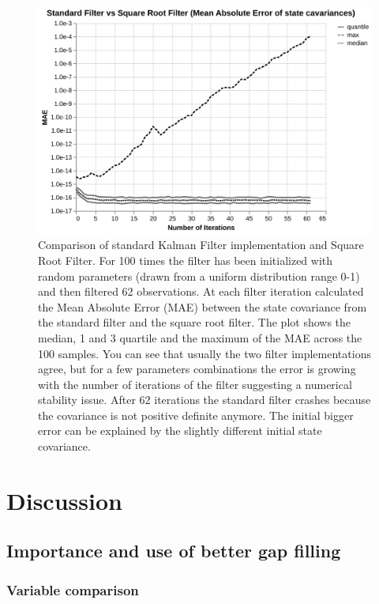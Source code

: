 \documentclass{article}
\let\Oldsection\section
\renewcommand{\section}{\FloatBarrier\Oldsection}
\let\Oldsubsection\subsection
\renewcommand{\subsection}{\FloatBarrier\Oldsubsection}
\let\Oldsubsubsection\subsubsection
\renewcommand{\subsubsection}{\FloatBarrier\Oldsubsubsection}
\begin{document}
\begin{figure}
\includegraphics[width=\textwidth]{numerical_stability}
 \caption{Comparison of standard Kalman Filter implementation and Square Root Filter. For 100 times the filter has been initialized with random parameters (drawn from a uniform distribution range 0-1) and then filtered 62 observations. At each filter iteration calculated the Mean Absolute Error (MAE) between the state covariance from the standard filter and the square root filter. The plot shows the median, 1 and 3 quartile and the maximum of the MAE across the 100 samples. You can see that usually the two filter implementations agree, but for a few parameters combinations the error is growing with the number of iterations of the filter suggesting a numerical stability issue. After 62 iterations the standard filter crashes because the covariance is not positive definite anymore. The initial bigger error can be explained by the slightly different initial state covariance.}
\end{figure}



\subparagraph{}

\section{Discussion}

\subsection{Importance and use of better gap filling}


\subsubsection{Variable comparison}
\end{document}
